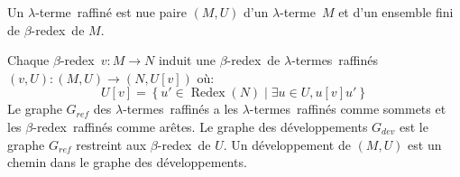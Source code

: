 \documentclass[math, info]{cours}
\def\lambdaterme{$\lambda$-terme\ }
\def\lambdatermes{$\lambda$-termes\ }
\def\betaredex{$\beta$-redex\ }
\DeclareMathOperator{\Redex}{Redex}
\begin{document}
\begin{definition}
	Un \lambdaterme raffiné est nue paire $(M, U)$ d'un \lambdaterme $M$ et d'un ensemble fini de \betaredex de $M$.
	\label{def:raffinement.}
\end{definition}
\begin{definition}
	Chaque \betaredex $v: M \to N$ induit une \betaredex de \lambdatermes raffinés $(v, U): (M, U) \to (N, U[v])$ où:
	\begin{equation*}
		U[v] = \left\{u'\in \Redex(N) \mid \exists u\in U, u[v]u' \right\}
	\end{equation*}
	Le graphe $G_{ref}$ des \lambdatermes raffinés a les \lambdatermes raffinés comme sommets et les \betaredex raffinés comme arêtes.
	Le graphe des développements $G_{dev}$ est le graphe $G_{ref}$ restreint aux \betaredex de $U$.
	Un développement de $(M, U)$ est un chemin dans le graphe des développements.
	\label{def:graphedéveloppement}
\end{definition}
\end{document}

